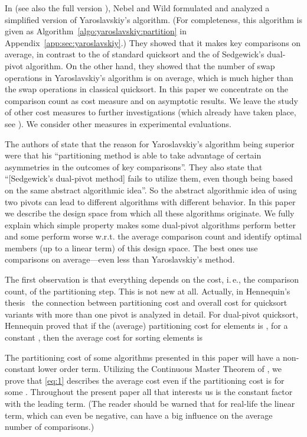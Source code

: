 \documentclass[prodmode,acmtalg]{acmsmall}
\begin{document}
In \cite{nebel12} (see also the full version \cite{WildNN15}), Nebel and Wild
formulated and analyzed a simplified version
of Yaroslavskiy's algorithm. (For completeness, this algorithm is given as
Algorithm~\ref{algo:yaroslavskiy:partition} in
Appendix~\ref{app:sec:yaroslavskiy}.) They showed that it makes  key comparisons on average, in contrast to the  of standard
quicksort and the  of Sedgewick's dual-pivot
algorithm. On the other hand, they showed that the number of swap operations in
Yaroslavskiy's algorithm  is  on average, which is much
higher than the  swap operations in classical quicksort.  In
this paper we concentrate on the comparison count as
cost measure and on asymptotic results. We leave the study of other cost measures
to further investigations (which already have taken place, see \cite{MartinezNW15}).
We consider other measures in experimental evaluations.

The authors of \cite{nebel12} state that the reason for Yaroslavskiy's algorithm
being superior were that his ``partitioning method is able to take advantage of
certain asymmetries in the
outcomes of key comparisons''. They also state that ``[Sedgewick's dual-pivot method] fails to utilize them, even though
being based on the same abstract algorithmic idea''.  
So the abstract algorithmic idea of using two pivots can lead to different algorithms with different behavior. 
In this paper we describe the design space from which all these algorithms originate.
We fully explain which simple property makes some dual-pivot algorithms perform
better and some perform worse w.r.t. the average comparison count
and identify optimal members (up to a linear term) of this design
space. The best ones use  comparisons on average---even less than Yaroslavskiy's
method.

The first observation is that everything depends on the cost, i.\,e., the comparison count, of the partitioning
step.
This is not new at all. Actually, in Hennequin's thesis~\cite{hennequin}
the connection between partitioning cost and overall cost 
for quicksort variants with more than one pivot is analyzed in detail.
For dual-pivot quicksort, Hennequin proved that 
if the (average) partitioning cost for  elements is , for a constant , then the average cost for sorting  elements is 

The partitioning cost of some algorithms presented in this paper will have a non-constant lower order term.
Utilizing the Continuous Master Theorem of \cite{Roura01},
we prove that \eqref{eq:1} describes the average cost even if the partitioning cost is  for 
some .
Throughout the present paper all that interests us is the constant factor with the leading term.
(The reader should be warned that for real-life  the linear term,
which can even be negative, can have a big influence
on the average number of comparisons.)
\end{document}
